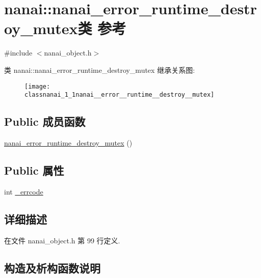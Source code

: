\hypertarget{classnanai_1_1nanai__error__runtime__destroy__mutex}{}\section{nanai\+:\+:nanai\+\_\+error\+\_\+runtime\+\_\+destroy\+\_\+mutex类 参考}
\label{classnanai_1_1nanai__error__runtime__destroy__mutex}


{\ttfamily \#include $<$nanai\+\_\+object.\+h$>$}

类 nanai\+:\+:nanai\+\_\+error\+\_\+runtime\+\_\+destroy\+\_\+mutex 继承关系图\+:\begin{figure}[H]
\begin{center}
\leavevmode
\texttt{[image: classnanai\_1\_1nanai\_\_error\_\_runtime\_\_destroy\_\_mutex]}
\end{center}
\end{figure}
\subsection*{Public 成员函数}
\begin{DoxyCompactItemize}
\item 
\hyperlink{classnanai_1_1nanai__error__runtime__destroy__mutex_a8cf012bdc03827ba61f3d3825c9c3ee4}{nanai\+\_\+error\+\_\+runtime\+\_\+destroy\+\_\+mutex} ()
\end{DoxyCompactItemize}
\subsection*{Public 属性}
\begin{DoxyCompactItemize}
\item 
int \hyperlink{classnanai_1_1nanai__error__runtime__destroy__mutex_a8d75df933f0f165a5d9ee57173c3dd21}{\+\_\+errcode}
\end{DoxyCompactItemize}


\subsection{详细描述}


在文件 nanai\+\_\+object.\+h 第 99 行定义.



\subsection{构造及析构函数说明}
\hypertarget{classnanai_1_1nanai__error__runtime__destroy__mutex_a8cf012bdc03827ba61f3d3825c9c3ee4}{}
